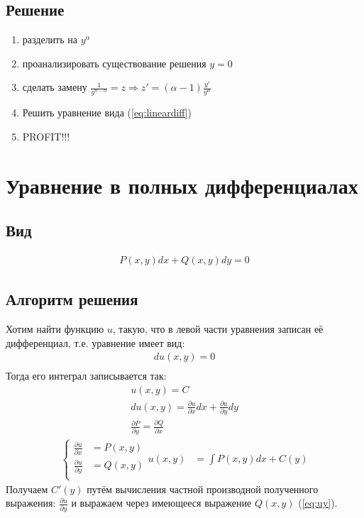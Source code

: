 \documentclass[fontsize=10pt,a4paper,fleqn]{scrreprt} %
\numberwithin{equation}{section}
\begin{document}
\subsection{Решение}
\begin{enumerate}
\item разделить на $y^\alpha$
\item проанализировать существование решения $y = 0$
\item сделать замену $\frac1{y^{n-\alpha}} = z \Rightarrow z' = (\alpha - 1)\frac{y'}{y^\alpha}$
\item Решить уравнение вида (\ref{eq:lineardiff})
\item PROFIT!!!
\end{enumerate}

\section{Уравнение в полных дифференциалах}
\label{sec:fulldiff}

\subsection{Вид}
\begin{align}
  \boxed{P(x,y)dx + Q(x,y)dy = 0}
\end{align}

\subsection{Алгоритм решения}
Хотим найти функцию $u$, такую, что в левой части уравнения записан её дифференциал, т.е. уравнение имеет вид:
\begin{align*}
  du(x,y) = 0\\
\end{align*}
Тогда его интеграл записывается так:
\begin{align*}
u(x,y) = C\\
  du(x,y) = \frac{\partial u}{\partial x}dx + \frac{\partial u}{\partial y}dy\\
  \boxed{\frac{\partial P}{\partial y} = \frac{\partial Q}{\partial x}}
\end{align*}
\begin{align}
  \begin{cases}
    \frac{\partial u}{\partial x} &= P(x,y)\\
    \frac{\partial u}{\partial y} &= Q(x,y)\label{eq:uy}\\
  \end{cases}
  u(x,y) &= \int{}P(x,y)dx + C(y)
\end{align}
Получаем $C'(y)$ путём вычисления частной производной полученного выражения: $\frac{\partial u}{\partial y}$ и выражаем через имеющееся выражение $Q(x,y)$ (\ref{eq:uy}).
\end{document}
